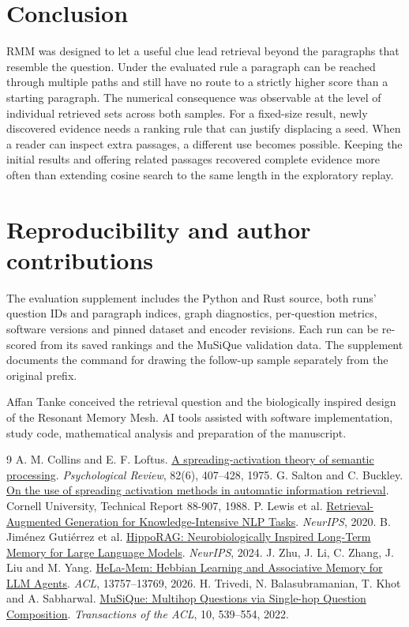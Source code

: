 \documentclass[11pt,a4paper]{article}
\begin{document}
\section{Conclusion}
RMM was designed to let a useful clue lead retrieval beyond the paragraphs that resemble the question. Under the evaluated rule a paragraph can be reached through multiple paths and still have no route to a strictly higher score than a starting paragraph. The numerical consequence was observable at the level of individual retrieved sets across both samples. For a fixed-size result, newly discovered evidence needs a ranking rule that can justify displacing a seed. When a reader can inspect extra passages, a different use becomes possible. Keeping the initial results and offering related passages recovered complete evidence more often than extending cosine search to the same length in the exploratory replay.

\newpage
\section*{Reproducibility and author contributions}
The evaluation supplement includes the Python and Rust source, both runs' question IDs and paragraph indices, graph diagnostics, per-question metrics, software versions and pinned dataset and encoder revisions. Each run can be re-scored from its saved rankings and the MuSiQue validation data. The supplement documents the command for drawing the follow-up sample separately from the original prefix.

Affan Tanke conceived the retrieval question and the biologically inspired design of the Resonant Memory Mesh. AI tools assisted with software implementation, study code, mathematical analysis and preparation of the manuscript.

\begin{thebibliography}{9}
 A. M. Collins and E. F. Loftus. \href{https://doi.org/10.1037/0033-295X.82.6.407}{A spreading-activation theory of semantic processing}. \emph{Psychological Review}, 82(6), 407--428, 1975.
 G. Salton and C. Buckley. \href{https://hdl.handle.net/1813/6747}{On the use of spreading activation methods in automatic information retrieval}. Cornell University, Technical Report 88-907, 1988.
 P. Lewis et al. \href{https://proceedings.neurips.cc/paper/2020/hash/6b493230205f780e1bc26945df7481e5-Abstract.html}{Retrieval-Augmented Generation for Knowledge-Intensive NLP Tasks}. \emph{NeurIPS}, 2020.
 B. Jiménez Gutiérrez et al. \href{https://arxiv.org/abs/2405.14831}{HippoRAG: Neurobiologically Inspired Long-Term Memory for Large Language Models}. \emph{NeurIPS}, 2024.
 J. Zhu, J. Li, C. Zhang, J. Liu and M. Yang. \href{https://aclanthology.org/2026.acl-long.625/}{HeLa-Mem: Hebbian Learning and Associative Memory for LLM Agents}. \emph{ACL}, 13757--13769, 2026.
 H. Trivedi, N. Balasubramanian, T. Khot and A. Sabharwal. \href{https://aclanthology.org/2022.tacl-1.31/}{MuSiQue: Multihop Questions via Single-hop Question Composition}. \emph{Transactions of the ACL}, 10, 539--554, 2022.
\end{thebibliography}
\end{document}
